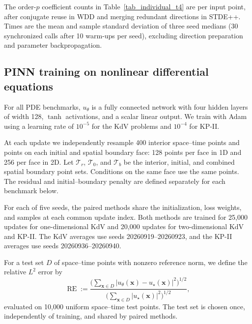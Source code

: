 \documentclass[final,oneeqnum]{siamltex}
\newcommand{\bx}{\bm{x}}
\begin{document}
The order-$p$ coefficient counts in Table~\ref{tab_individual_t4} are per input point, after conjugate reuse in WDD and merging redundant directions in STDE++.
Times are the mean and sample standard deviation of three seed medians (30 synchronized calls after 10 warm-ups per seed), excluding direction preparation and parameter backpropagation.

\begin{table}[htbp]
    \centering
    \footnotesize
    \setlength{\tabcolsep}{3pt}
    \renewcommand{\arraystretch}{1.3}
    \caption{Ranks, Taylor coefficient counts, and evaluation times on a Tesla V100 for WDD and STDE++~\cite[Section~6.1]{Shi2026stdepp}.
        Times are means and sample standard deviations of three seed medians, and speedups are means of paired ratios of STDE++ to WDD times.}
    \label{tab_individual_t4}
    
\end{table}

\FloatBarrier

\subsection{PINN training on nonlinear differential equations}

For all PDE benchmarks, $u_\theta$ is a fully connected network with four hidden layers of width 128, $\tanh$ activations, and a scalar linear output.
We train with Adam~\cite{Kingma2015} using a learning rate of $10^{-5}$ for the KdV problems and $10^{-4}$ for KP-II.

At each update we independently resample 400 interior space--time points and points on each initial and spatial boundary face: 128 points per face in 1D and 256 per face in 2D.
Let $\mathcal T_r$, $\mathcal T_0$, and $\mathcal T_b$ be the interior, initial, and combined spatial boundary point sets.
Conditions on the same face use the same points.
The residual and initial--boundary penalty are defined separately for each benchmark below.

For each of five seeds, the paired methods share the initialization, loss weights, and samples at each common update index.
Both methods are trained for 25,000 updates for one-dimensional KdV and 20,000 updates for two-dimensional KdV and KP-II.
The KdV averages use seeds 20260919--20260923, and the KP-II averages use seeds 20260936--20260940.

For a test set $D$ of space--time points with nonzero reference norm, we define the relative $L^2$ error by
\begin{equation}\label{eq_num_relative_error}
    \operatorname{RE} := \frac{\bigl(\sum_{\bx \in D} |u_\theta(\bx) - u_\star(\bx)|^2\bigr)^{1 / 2}} {\bigl(\sum_{\bx \in D} |u_\star(\bx)|^2\bigr)^{1 / 2}},
\end{equation}
evaluated on 10,000 uniform space--time test points.
The test set is chosen once, independently of training, and shared by paired methods.
\end{document}
